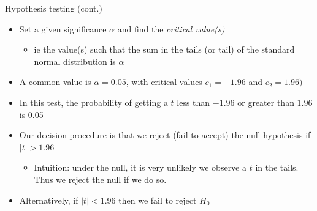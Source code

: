\documentclass[aspectratio=169]{beamer}
\begin{document}
\begin{frame}{Hypothesis testing (cont.)}
    \begin{itemize}
        \item Set a given significance $\alpha$ and find the \textit{critical value(s)}
        \begin{itemize}
            \item ie the value(s) such that the sum in the tails (or tail) of the standard normal distribution is $\alpha$
        \end{itemize}
        \item A common value is $\alpha=0.05$, with critical values $c_1=-1.96$ and $c_2 = 1.96)$
        \item In this test, the probability of getting a $t$ less than $-1.96$ or greater than $1.96$ is 0.05
        \item Our decision procedure is that we reject (fail to accept) the null hypothesis if $|t| > 1.96$
        \begin{itemize}
            \item Intuition: under the null, it is very unlikely we observe a $t$ in the tails. Thus we reject the null if we do so.
        \end{itemize}
        \item Alternatively, if $|t| < 1.96 $ then we fail to reject $H_0$
    \end{itemize}
\end{frame}
\end{document}
